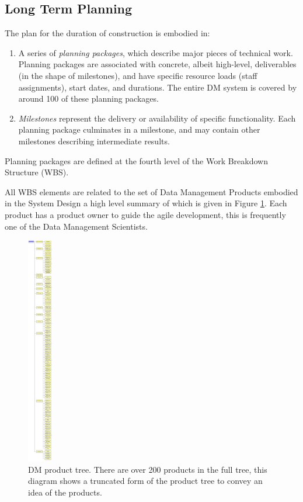 \subsection{Long Term Planning}
\label{sec:long-term-plan}

The plan for the duration of construction is embodied in:

\begin{enumerate}
\item
  A series of \emph{planning packages}, which describe major pieces of
  technical work. Planning packages are associated with concrete, albeit
  high-level, deliverables (in the shape of milestones), and have
  specific resource loads (staff assignments), start dates, and
  durations. The entire DM system is covered by around 100 of these
  planning packages.
\item
  \emph{Milestones} represent the delivery or availability of specific
  functionality. Each planning package culminates in a milestone, and
  may contain other milestones describing intermediate results.
\end{enumerate}

Planning packages are defined at the fourth level of the Work Breakdown Structure (WBS).

All WBS elements are related to the set of Data Management Products embodied in the System Design \cite{LDM-148} a high level summary of which is given in
Figure \ref{fig:prods}. Each product has a product owner to guide the agile development, this is frequently one of the Data Management Scientists.

\begin{figure}[htbp]
        \begin{center}
                 \includegraphics[height=10cm]{ProductTree}
                 \caption{DM product tree. \label{fig:prods} There are over 200 products in the full tree, this diagram shows a truncated form of the product tree to convey an idea of the products.
         }

         \end{center}
 \end{figure}

